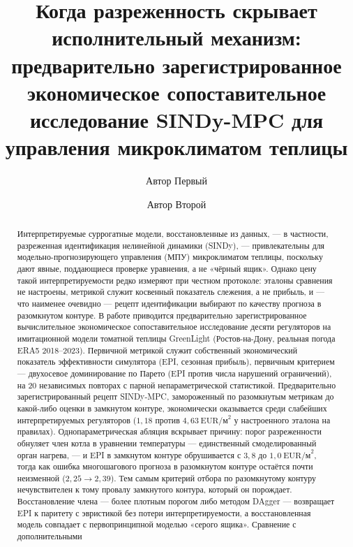 \documentclass[preprint,3p]{elsarticle}
\begin{document}
\begin{frontmatter}

\title{Когда разреженность скрывает исполнительный механизм: предварительно
зарегистрированное экономическое сопоставительное исследование SINDy-MPC для
управления микроклиматом теплицы}

\author[a]{Автор Первый}
\author[a]{Автор Второй}

\begin{abstract}
Интерпретируемые суррогатные модели, восстановленные из данных, — в частности,
разреженная идентификация нелинейной динамики (SINDy), — привлекательны для
модельно-прогнозирующего управления (МПУ) микроклиматом теплицы, поскольку дают явные,
поддающиеся проверке уравнения, а не «чёрный ящик». Однако цену такой интерпретируемости
редко измеряют при честном протоколе: эталоны сравнения не настроены, метрикой служит
косвенный показатель слежения, а не прибыль, и — что наименее очевидно — рецепт
идентификации выбирают по качеству прогноза в разомкнутом контуре. В работе приводится
предварительно зарегистрированное вычислительное экономическое сопоставительное
исследование десяти регуляторов на имитационной модели томатной теплицы GreenLight
(Ростов-на-Дону, реальная погода ERA5 2018--2023). Первичной метрикой служит собственный
экономический показатель эффективности симулятора (EPI, сезонная прибыль), первичным
критерием — двухосевое доминирование по Парето (EPI против числа нарушений ограничений),
на 20 независимых повторах с парной непараметрической статистикой. Предварительно
зарегистрированный рецепт SINDy-MPC, замороженный по разомкнутым метрикам до какой-либо
оценки в замкнутом контуре, экономически оказывается среди слабейших интерпретируемых
регуляторов ($1{,}18$ против $4{,}63~\text{EUR/м}^2$ у настроенного эталона на правилах).
Однопараметрическая абляция вскрывает причину: порог разреженности обнуляет член котла в
уравнении температуры — единственный смоделированный орган нагрева, — и EPI в замкнутом
контуре обрушивается с $3{,}8$ до $1{,}0~\text{EUR/м}^2$, тогда как ошибка многошагового
прогноза в разомкнутом контуре остаётся почти неизменной ($2{,}25\to2{,}39$). Тем самым
критерий отбора по разомкнутому контуру нечувствителен к тому провалу замкнутого контура,
который он порождает. Восстановление члена — более плотным порогом либо методом DAgger —
возвращает EPI к паритету с эвристикой без потери интерпретируемости, а восстановленная
модель совпадает с первопринципной моделью «серого ящика». Сравнение с дополнительными

\end{abstract}
\end{frontmatter}
\end{document}
